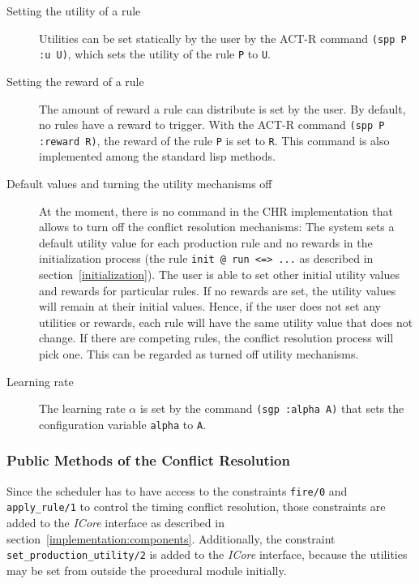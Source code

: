 \begin{description}
 \item[Setting the utility of a rule] Utilities can be set statically by the user by the ACT-R command \lstinline|(spp P :u U)|, which sets the utility of the rule \lstinline|P| to \lstinline|U|.
 \item[Setting the reward of a rule] The amount of reward a rule can distribute is set by the user. By default, no rules have a reward to trigger. With the ACT-R command \lstinline|(spp P :reward R)|, the reward of the rule \lstinline|P| is set to \lstinline|R|. This command is also implemented among the standard lisp methods.  
 \item[Default values and turning the utility mechanisms off] At the moment, there is no command in the CHR implementation that allows to turn off the conflict resolution mechanisms: The system sets a default utility value for each production rule and no rewards in the initialization process (the rule \lstinline|init @ run <=> ...| as described in section~\ref{initialization}). The user is able to set other initial utility values and rewards for particular rules. If no rewards are set, the utility values will remain at their initial values. Hence, if the user does not set any utilities or rewards, each rule will have the same utility value that does not change. If there are competing rules, the conflict resolution process will pick one. This can be regarded as turned off utility mechanisms.
 \item[Learning rate] The learning rate $\alpha$ is set by the command \lstinline|(sgp :alpha A)| that sets the configuration variable \lstinline|alpha| to \lstinline|A|.
\end{description}

\subsubsection{Public Methods of the Conflict Resolution}
\label{implementation:icore_interface}

Since the scheduler has to have access to the constraints \lstinline|fire/0| and \lstinline|apply_rule/1| to control the timing conflict resolution, those constraints are added to the \emph{ICore} interface as described in section~\ref{implementation:components}. Additionally, the constraint \lstinline|set_production_utility/2| is added to the \emph{ICore} interface, because the utilities may be set from outside the procedural module initially.

